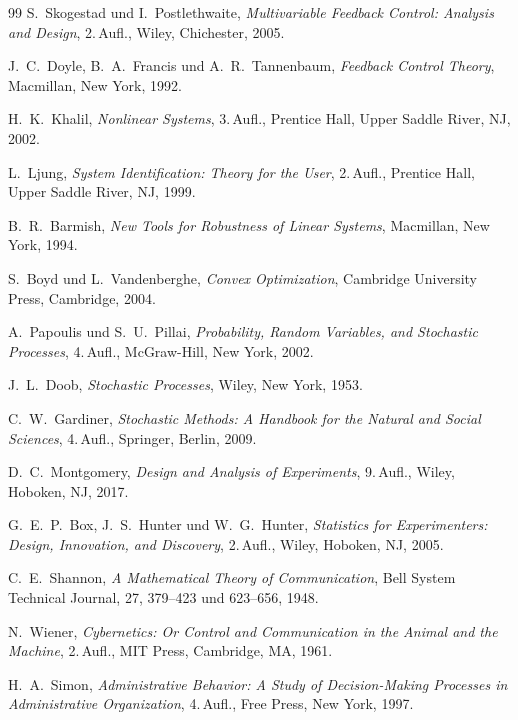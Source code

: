 \documentclass[a4paper,12pt,twoside]{report}
\theoremstyle{definition}
\begin{document}
\begin{thebibliography}{99}
	S.~Skogestad und I.~Postlethwaite,
	\textit{Multivariable Feedback Control: Analysis and Design},
	2.\,Aufl., Wiley, Chichester, 2005.

	J.~C.~Doyle, B.~A.~Francis und A.~R.~Tannenbaum,
	\textit{Feedback Control Theory},
	Macmillan, New York, 1992.

	H.~K.~Khalil,
	\textit{Nonlinear Systems},
	3.\,Aufl., Prentice Hall, Upper Saddle River, NJ, 2002.

	L.~Ljung,
	\textit{System Identification: Theory for the User},
	2.\,Aufl., Prentice Hall, Upper Saddle River, NJ, 1999.

	B.~R.~Barmish,
	\textit{New Tools for Robustness of Linear Systems},
	Macmillan, New York, 1994.

	S.~Boyd und L.~Vandenberghe,
	\textit{Convex Optimization},
	Cambridge University Press, Cambridge, 2004.

	A.~Papoulis und S.~U.~Pillai,
	\textit{Probability, Random Variables, and Stochastic Processes},
	4.\,Aufl., McGraw-Hill, New York, 2002.

	J.~L.~Doob,
	\textit{Stochastic Processes},
	Wiley, New York, 1953.

	C.~W.~Gardiner,
	\textit{Stochastic Methods: A Handbook for the Natural and Social Sciences},
	4.\,Aufl., Springer, Berlin, 2009.

	D.~C.~Montgomery,
	\textit{Design and Analysis of Experiments},
	9.\,Aufl., Wiley, Hoboken, NJ, 2017.

	G.~E.~P.~Box, J.~S.~Hunter und W.~G.~Hunter,
	\textit{Statistics for Experimenters: Design, Innovation, and Discovery},
	2.\,Aufl., Wiley, Hoboken, NJ, 2005.

	C.~E.~Shannon,
	\textit{A Mathematical Theory of Communication},
	Bell System Technical Journal, 27, 379--423 und 623--656, 1948.

	N.~Wiener,
	\textit{Cybernetics: Or Control and Communication in the Animal and the Machine},
	2.\,Aufl., MIT Press, Cambridge, MA, 1961.

	H.~A.~Simon,
	\textit{Administrative Behavior: A Study of Decision-Making Processes in Administrative Organization},
	4.\,Aufl., Free Press, New York, 1997.


\end{thebibliography}
\end{document}
